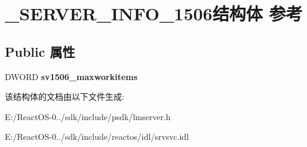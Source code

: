 \hypertarget{struct___s_e_r_v_e_r___i_n_f_o__1506}{}\section{\+\_\+\+S\+E\+R\+V\+E\+R\+\_\+\+I\+N\+F\+O\+\_\+1506结构体 参考}
\label{struct___s_e_r_v_e_r___i_n_f_o__1506}
\subsection*{Public 属性}
\begin{DoxyCompactItemize}
\item 
\mbox{\label{struct___s_e_r_v_e_r___i_n_f_o__1506_a35ac2a2fb9104a1163a6d60aee941886}} 
D\+W\+O\+RD {\bfseries sv1506\+\_\+maxworkitems}
\end{DoxyCompactItemize}


该结构体的文档由以下文件生成\+:\begin{DoxyCompactItemize}
\item 
E\+:/\+React\+O\+S-\/0../sdk/include/psdk/lmserver.\+h\item 
E\+:/\+React\+O\+S-\/0../sdk/include/reactos/idl/srvsvc.\+idl\end{DoxyCompactItemize}
